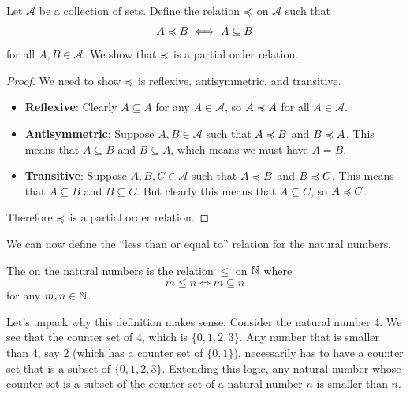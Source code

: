 \begin{example}\label{example:subset-partial-order}
    Let $\mathcal{A}$ be a collection of sets. Define the relation $\preccurlyeq$ on $\mathcal{A}$ such that
    \[
        A \mathrel{\preccurlyeq} B \iff A \subseteq B
    \]
    for all $A,B \in \mathcal{A}$. We show that $\preccurlyeq$ is a partial order relation.
    \begin{proof}
        We need to show $\preccurlyeq$ is reflexive, antisymmetric, and transitive.
        \begin{itemize}
            \item \textbf{Reflexive}: Clearly $A \subseteq A$ for any $A \in \mathcal{A}$, so $A \mathrel{\preccurlyeq} A$ for all $A \in \mathcal{A}$.
            
            \item \textbf{Antisymmetric}: Suppose $A, B \in \mathcal{A}$ such that $A \mathrel{\preccurlyeq} B$ and $B \mathrel{\preccurlyeq} A$. This means that $A \subseteq B$ and $B \subseteq A$, which means we must have $A = B$.
            
            \item \textbf{Transitive}: Suppose $A, B, C \in \mathcal{A}$ such that $A \mathrel{\preccurlyeq} B$ and $B \mathrel{\preccurlyeq} C$. This means that $A \subseteq B$ and $B \subseteq C$. But clearly this means that $A \subseteq C$, so $A \mathrel{\preccurlyeq} C$.
        \end{itemize}
        Therefore $\preccurlyeq$ is a partial order relation.
    \end{proof}
\end{example}

We can now define the ``less than or equal to'' relation for the natural numbers.

\begin{definition}
    The  on the natural numbers is the relation $\leq$ on $\mathbb{N}$ where
    \[
        m \leq n \iff m \subseteq n
    \]
    for any $m, n \in \mathbb{N}$.
\end{definition}

Let's unpack why this definition makes sense. Consider the natural number 4. We see that the counter set of 4, which is $\{0, 1, 2, 3\}$. Any number that is smaller than 4, say 2 (which has a counter set of $\{0, 1\}$), necessarily has to have a counter set that is a subset of $\{0, 1, 2, 3\}$. Extending this logic, any natural number whose counter set is a subset of the counter set of a natural number $n$ is smaller than $n$.

